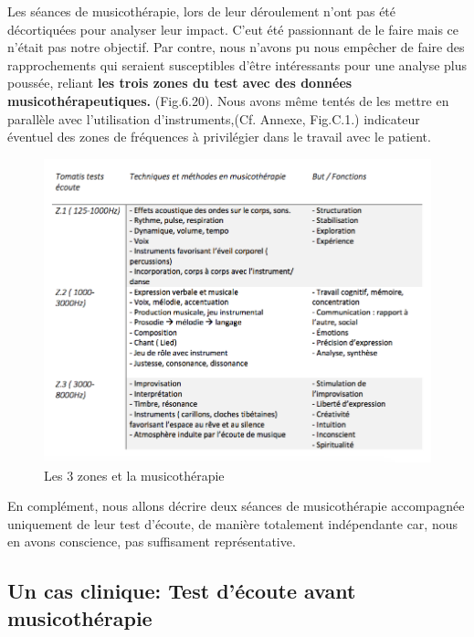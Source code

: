 Les séances de musicothérapie, lors de leur déroulement n'ont pas été 
décortiquées pour analyser leur impact. C'eut
été passionnant de le faire mais ce n'était pas notre objectif.
Par contre, nous n'avons pu nous empêcher de faire des rapprochements
qui seraient susceptibles d'être intéressants pour une analyse plus
poussée, reliant\textbf{ les trois zones du
test avec des données musicothérapeutiques.}
(Fig.6.20).
Nous avons même tentés de les mettre
en parallèle avec l'utilisation d'instruments,(Cf. Annexe, Fig.C.1.)
indicateur éventuel des zones de fréquences à
privilégier dans le travail avec le patient.
\begin{figure}
	\centering
	\includegraphics[width=1\linewidth]{images/testtechnmethbut}
	\caption[Zones du test avec la musicothérapie]{Les 3 
          zones et la musicothérapie}
       
	\label{testbutetfonction}
\end{figure}

 
   
En complément, nous allons décrire deux séances de
musicothérapie accompagnée uniquement de leur test d'écoute, de
manière totalement indépendante car, nous en avons conscience, pas
suffisament représentative.
\subsection{Un cas clinique: Test d'écoute avant musicothérapie}

